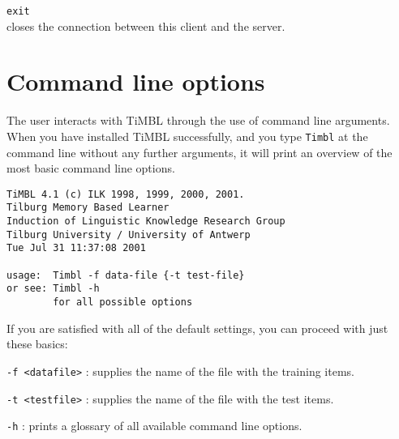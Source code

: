 \documentclass{report}
\begin{document}
\begin{description}
\item {\tt exit}\\
      closes the connection between this client and the server.
\end{description}

\chapter{Command line options}
\label{commandline}

The user interacts with TiMBL through the use of command line arguments.
When you have installed TiMBL successfully, and you type {\tt Timbl} at the
command line without any further arguments, it will print an overview
of the most basic command line options. 

\begin{verbatim}
TiMBL 4.1 (c) ILK 1998, 1999, 2000, 2001.
Tilburg Memory Based Learner
Induction of Linguistic Knowledge Research Group
Tilburg University / University of Antwerp
Tue Jul 31 11:37:08 2001

usage:  Timbl -f data-file {-t test-file}
or see: Timbl -h
        for all possible options
\end{verbatim}

If you are satisfied with all of the default settings, you can proceed
with just these basics:

\begin{description}

\item {\tt -f <datafile>} : supplies the name of the file with the
training items.
\item {\tt -t <testfile>} : supplies the name of the file with the
test items.
\item {\tt -h} : prints a glossary of all available command line 
options.

\end{description}
\end{document}
